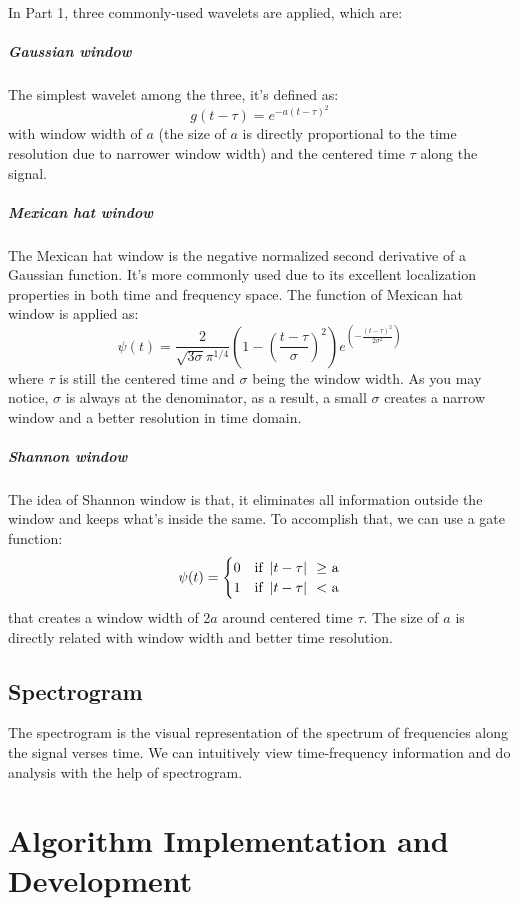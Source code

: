\documentclass[10pt]{article}
\begin{document}
In Part 1, three commonly-used wavelets are applied, which are:
\subparagraph{Gaussian window}
The simplest wavelet among the three, it's defined as:
\begin{equation}\label{3}
g(t-\tau) = e^{-a(t-\tau)^2}
\end{equation}
with window width of $a$ (the size of $a$ is directly proportional to the time resolution due to narrower window width) and the centered time $\tau$ along the signal.
\vskip 0.2cm
\subparagraph{Mexican hat window}
The Mexican hat window is the negative normalized second derivative of a Gaussian function. It's more commonly used due to its excellent localization properties in both time and frequency space. The function of Mexican hat window is applied as:
\begin{equation}\label{4}
\psi(t)=\frac{2}{\sqrt{3\sigma}\pi^{1/4}}(1-(\frac{t-\tau}{\sigma})^2)e^{(-\frac{(t-\tau)^2}{2\sigma^2})}
\end{equation}
where $\tau$ is still the centered time and $\sigma$ being the window width. As you may notice, $\sigma$ is always at the denominator, as a result, a small $\sigma$ creates a narrow window and a better resolution in time domain.
\vskip 0.2cm
\subparagraph{Shannon window}
The idea of Shannon window is that, it eliminates all information outside the window and keeps what's inside the same. To accomplish that, we can use a gate function:
\begin{equation}\label{5}
\psi(t)=
\begin{cases}
0 &\text{if \abs{t-\tau} $\geq$ a} \\
1 &\text{if \abs{t-\tau} $<$ a} \\
\end{cases}
\end{equation}
that creates a window width of 2$a$ around centered time $\tau$. The size of $a$ is directly related with window width and better time resolution.

\par
\vskip 0.5cm

\subsection{Spectrogram}
The spectrogram is the visual representation of the spectrum of frequencies along the signal verses time. We can intuitively view time-frequency information and do analysis with the help of spectrogram.

\section{Algorithm Implementation and Development}
\end{document}
